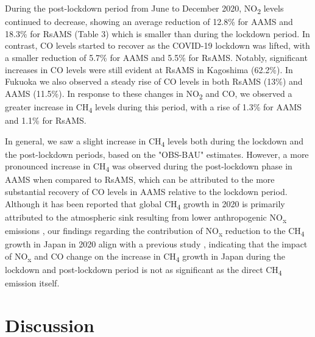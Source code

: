 During the post-lockdown period from June to December 2020, NO\textsubscript{2} levels continued to decrease, showing an average reduction of 12.8\% for AAMS and 18.3\% for RsAMS (Table 3) which is smaller than during the lockdown period. In contrast, CO levels started to recover as the COVID-19 lockdown was lifted, with a smaller reduction of 5.7\% for AAMS and 5.5\% for RsAMS. Notably, significant increases in CO levels were still evident at RsAMS in Kagoshima (62.2\%). In Fukuoka we also observed a steady rise of CO levels in both RsAMS (13\%) and AAMS (11.5\%). In response to these changes in NO\textsubscript{2} and CO, we observed a greater increase in CH\textsubscript{4} levels during this period, with a rise of 1.3\% for AAMS and 1.1\% for RsAMS.\par
In general, we saw a slight increase in CH\textsubscript{4} levels both during the lockdown and the post-lockdown periods, based on the "OBS-BAU" estimates. However, a more pronounced increase in CH\textsubscript{4} was observed during the post-lockdown phase in AAMS when compared to RsAMS, which can be attributed to the more substantial recovery of CO levels in AAMS relative to the lockdown period. Although it has been reported that global CH\textsubscript{4} growth in 2020 is primarily attributed to the atmospheric sink resulting from lower anthropogenic NO\textsubscript{x} emissions \citep{stevenson2022covid,peng2022wetland}, our findings regarding the contribution of NO\textsubscript{x} reduction to the CH\textsubscript{4} growth in Japan in 2020 align with a previous study \citep{akimoto2022rethinking,qu2022attribution,feng2023methane}, indicating that the impact of NO\textsubscript{x} and CO change on the increase in CH\textsubscript{4} growth in Japan during the lockdown and post-lockdown period is not as significant as the direct CH\textsubscript{4} emission itself. \par

\section{Discussion} \label{chap4_disscussion}
